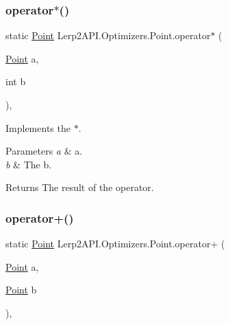 \subsubsection{\texorpdfstring{operator$\ast$()}{operator*()}\hspace{0.1cm}{\footnotesize\ttfamily [2/2]}}
{\footnotesize\ttfamily static \hyperlink{struct_lerp2_a_p_i_1_1_optimizers_1_1_point}{Point} Lerp2\+A\+P\+I.\+Optimizers.\+Point.\+operator$\ast$ (\begin{DoxyParamCaption}\item[{\hyperlink{struct_lerp2_a_p_i_1_1_optimizers_1_1_point}{Point}}]{a,  }\item[{int}]{b }\end{DoxyParamCaption})\hspace{0.3cm}{\ttfamily [inline]}, {\ttfamily [static]}}



Implements the $\ast$. 


\begin{DoxyParams}{Parameters}
{\em a} & a.\\
\hline
{\em b} & The b.\\
\hline
\end{DoxyParams}
\begin{DoxyReturn}{Returns}
The result of the operator.
\end{DoxyReturn}
\mbox{\label{struct_lerp2_a_p_i_1_1_optimizers_1_1_point_a0b19fb34522b22ddaa2e4e867e165555}} 
\subsubsection{\texorpdfstring{operator+()}{operator+()}}
{\footnotesize\ttfamily static \hyperlink{struct_lerp2_a_p_i_1_1_optimizers_1_1_point}{Point} Lerp2\+A\+P\+I.\+Optimizers.\+Point.\+operator+ (\begin{DoxyParamCaption}\item[{\hyperlink{struct_lerp2_a_p_i_1_1_optimizers_1_1_point}{Point}}]{a,  }\item[{\hyperlink{struct_lerp2_a_p_i_1_1_optimizers_1_1_point}{Point}}]{b }\end{DoxyParamCaption})\hspace{0.3cm}{\ttfamily [inline]}, {\ttfamily [static]}}



